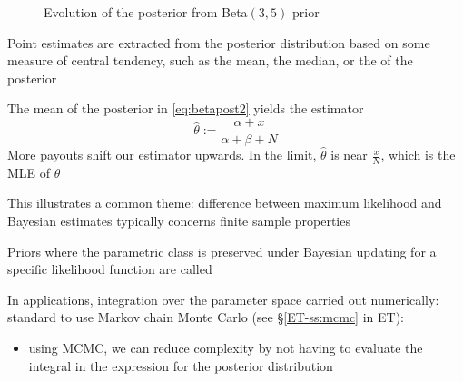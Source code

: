 \begin{frame}
    
    \begin{figure}
       \begin{center}
        \caption{\label{f:beta_bayes} Evolution of the posterior from Beta$(3, 5)$
        prior}
       \end{center}
    \end{figure}

\end{frame}

\begin{frame}

    \vspace{2em}
    Point estimates are extracted from the posterior distribution based on some
    measure of central tendency, such as the mean, the median, or the 
    of the posterior
    
    \vspace{.7em}
    \Eg
        The mean of the posterior in \eqref{eq:betapost2} yields the estimator
        \begin{equation*}
            \hat \theta := \frac{\alpha + x}{\alpha + \beta + N}
        \end{equation*}
        More payouts shift our estimator upwards.  In the limit, $\hat \theta$ is
        near $\frac{x}{N}$, which is the MLE of $\theta$
        
        This illustrates a common theme: difference between maximum likelihood and
        Bayesian estimates typically concerns finite sample properties
        
\end{frame}

\begin{frame}
    
    \vspace{2em}
    Priors where the parametric class is preserved
    under Bayesian updating for a specific likelihood function are called
    
    \vspace{.7em}
    In applications, integration over the parameter space carried out
    numerically: standard to use Markov chain Monte Carlo (see \S\ref{ET-ss:mcmc} in ET):
    \begin{itemize}
        \item using MCMC, we can reduce complexity by not having 
        to evaluate the integral in the expression for the posterior distribution
    \end{itemize}
    
\end{frame}

